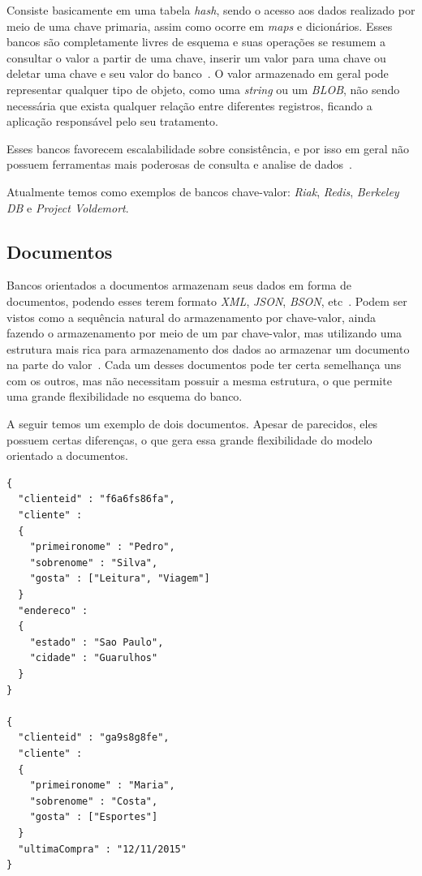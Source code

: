 Consiste basicamente em uma tabela \emph{hash}, sendo o acesso aos dados realizado por meio de uma chave primaria, assim como ocorre em \emph{maps} e dicionários.  Esses bancos são completamente livres de esquema e suas operações se resumem a consultar o valor a partir de uma chave, inserir um valor para uma chave ou deletar uma chave e seu valor do banco~\cite{nosqleval}. O valor armazenado em geral pode representar qualquer tipo de objeto, como uma \emph{string} ou um \emph{BLOB}, não sendo necessária que exista qualquer relação entre diferentes registros, ficando a aplicação responsável pelo seu tratamento. 

Esses bancos favorecem escalabilidade sobre consistência, e por isso em geral não possuem ferramentas mais poderosas de consulta e analise de dados~\cite{chrisnosql}.

Atualmente temos como exemplos de bancos chave-valor: \emph{Riak}, \emph{Redis}, \emph{Berkeley DB} e \emph{Project Voldemort}.

\subsection*{Documentos}
Bancos orientados a documentos armazenam seus dados em forma de documentos, podendo esses terem formato \emph{XML}, \emph{JSON}, \emph{BSON}, etc~\cite{pramod}. Podem ser vistos como a sequência natural do armazenamento por chave-valor, ainda fazendo o armazenamento por meio de um par chave-valor, mas utilizando uma estrutura mais rica para armazenamento dos dados ao armazenar um documento na parte do valor~\cite{chrisnosql}. Cada um desses documentos pode ter certa semelhança uns com os outros, mas não necessitam possuir a mesma estrutura, o que permite uma grande flexibilidade no esquema do banco.

A seguir temos um exemplo de dois documentos. Apesar de parecidos, eles possuem certas diferenças, o que gera essa grande flexibilidade do modelo orientado a documentos.

\begin{lstlisting}
{
  "clienteid" : "f6a6fs86fa",
  "cliente" :
  {
    "primeironome" : "Pedro",
    "sobrenome" : "Silva", 
    "gosta" : ["Leitura", "Viagem"]
  }
  "endereco" : 
  {
    "estado" : "Sao Paulo",
    "cidade" : "Guarulhos"
  }
}

{
  "clienteid" : "ga9s8g8fe",
  "cliente" :
  {
    "primeironome" : "Maria",
    "sobrenome" : "Costa", 
    "gosta" : ["Esportes"]
  }
  "ultimaCompra" : "12/11/2015"
}
\end{lstlisting}

